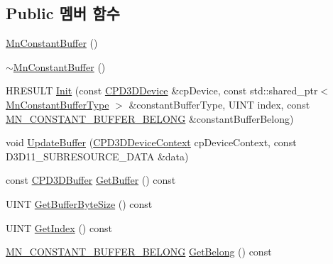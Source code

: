 \subsection*{Public 멤버 함수}
\begin{DoxyCompactItemize}
\item 
\hyperlink{class_m_n_l_1_1_mn_constant_buffer_a1ee7c81dedfacf937bef2831f5f296d2}{Mn\+Constant\+Buffer} ()
\item 
\hyperlink{class_m_n_l_1_1_mn_constant_buffer_a03796084c5f1842880022fb1024162ae}{$\sim$\+Mn\+Constant\+Buffer} ()
\item 
H\+R\+E\+S\+U\+LT \hyperlink{class_m_n_l_1_1_mn_constant_buffer_a16b6059a895eb7da76323aaffe61e915}{Init} (const \hyperlink{namespace_m_n_l_a1eec210db8f309a4a9ac0d9658784c31}{C\+P\+D3\+D\+Device} \&cp\+Device, const std\+::shared\+\_\+ptr$<$ \hyperlink{class_m_n_l_1_1_mn_constant_buffer_type}{Mn\+Constant\+Buffer\+Type} $>$ \&constant\+Buffer\+Type, U\+I\+NT index, const \hyperlink{namespace_m_n_l_a3f526411258a17023ecac1a36e666d42}{M\+N\+\_\+\+C\+O\+N\+S\+T\+A\+N\+T\+\_\+\+B\+U\+F\+F\+E\+R\+\_\+\+B\+E\+L\+O\+NG} \&constant\+Buffer\+Belong)
\item 
void \hyperlink{class_m_n_l_1_1_mn_constant_buffer_a35ca3bffb4e5a497fe2303b1fa3abae4}{Update\+Buffer} (\hyperlink{namespace_m_n_l_aab3aabb6c9360e44ddc8b0bb563c2107}{C\+P\+D3\+D\+Device\+Context} cp\+Device\+Context, const D3\+D11\+\_\+\+S\+U\+B\+R\+E\+S\+O\+U\+R\+C\+E\+\_\+\+D\+A\+TA \&data)
\item 
const \hyperlink{namespace_m_n_l_aab9c90a8c27ac6410a9cc7cd89efeef1}{C\+P\+D3\+D\+Buffer} \hyperlink{class_m_n_l_1_1_mn_constant_buffer_a313d7555609f87dc0f104b2a19ce3c87}{Get\+Buffer} () const
\item 
U\+I\+NT \hyperlink{class_m_n_l_1_1_mn_constant_buffer_ac5cec5ad72abe2c7659d4ee29d6b6cf9}{Get\+Buffer\+Byte\+Size} () const
\item 
U\+I\+NT \hyperlink{class_m_n_l_1_1_mn_constant_buffer_a7b39b7ae15b314a6d12de1181d5ff180}{Get\+Index} () const
\item 
\hyperlink{namespace_m_n_l_a3f526411258a17023ecac1a36e666d42}{M\+N\+\_\+\+C\+O\+N\+S\+T\+A\+N\+T\+\_\+\+B\+U\+F\+F\+E\+R\+\_\+\+B\+E\+L\+O\+NG} \hyperlink{class_m_n_l_1_1_mn_constant_buffer_aadb464e8b09a7c1602681842b583b6f8}{Get\+Belong} () const
\end{DoxyCompactItemize}
